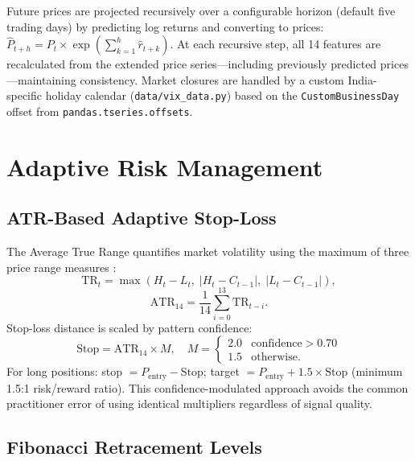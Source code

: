 \documentclass[ASNA,twocolumn]{USG}
\begin{document}
Future prices are projected recursively over a configurable horizon
(default five trading days) by predicting log returns and converting to prices:
$\hat{P}_{t+h} = P_t \times \exp(\sum_{k=1}^h \hat{r}_{t+k})$.
At each recursive step, all 14 features are recalculated from the extended
price series---including previously predicted prices---maintaining consistency.
Market closures are handled by a custom India-specific holiday calendar
(\texttt{data/vix\_data.py}) based on the \texttt{CustomBusinessDay}
offset from \texttt{pandas.tseries.offsets}.

\section{Adaptive Risk Management}\label{sec:risk}

\subsection{ATR-Based Adaptive Stop-Loss}

The Average True Range quantifies market volatility using the maximum of
three price range measures \citep{wilder1978, poon2003}:
\begin{equation}
  \text{TR}_t = \max(H_t - L_t,\; |H_t - C_{t-1}|,\; |L_t - C_{t-1}|),
  \label{eq:tr}
\end{equation}
\begin{equation}
  \text{ATR}_{14} = \frac{1}{14}\sum_{i=0}^{13} \text{TR}_{t-i}.
  \label{eq:atr}
\end{equation}
Stop-loss distance is scaled by pattern confidence:
\begin{equation}
  \text{Stop} = \text{ATR}_{14} \times M, \quad
  M = \begin{cases} 2.0 & \text{confidence} > 0.70 \\ 1.5 & \text{otherwise.}\end{cases}
  \label{eq:stop}
\end{equation}
For long positions: stop $= P_\text{entry} - \text{Stop}$;
target $= P_\text{entry} + 1.5 \times \text{Stop}$ (minimum 1.5:1
risk/reward ratio). This confidence-modulated approach avoids the common
practitioner error of using identical multipliers regardless of signal quality.

\subsection{Fibonacci Retracement Levels}
\end{document}
